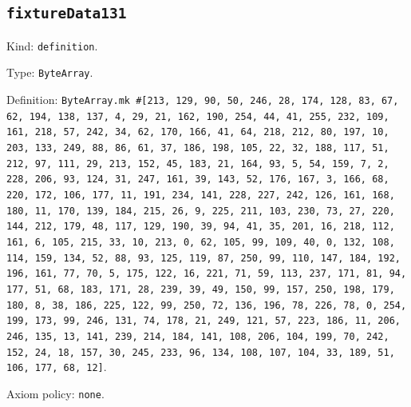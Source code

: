 \documentclass[11pt]{article}
\begin{document}
\subsection*{\texttt{fixtureData131}}
\noindent Kind: \texttt{definition}.\par
\noindent Type: \texttt{ByteArray}.\par
\noindent Definition: \texttt{ByteArray.mk \#[213, 129, 90, 50, 246, 28, 174, 128, 83, 67, 62, 194, 138, 137, 4, 29, 21, 162, 190, 254, 44, 41, 255, 232, 109, 161, 218, 57, 242, 34, 62, 170, 166, 41, 64, 218, 212, 80, 197, 10, 203, 133, 249, 88, 86, 61, 37, 186, 198, 105, 22, 32, 188, 117, 51, 212, 97, 111, 29, 213, 152, 45, 183, 21, 164, 93, 5, 54, 159, 7, 2, 228, 206, 93, 124, 31, 247, 161, 39, 143, 52, 176, 167, 3, 166, 68, 220, 172, 106, 177, 11, 191, 234, 141, 228, 227, 242, 126, 161, 168, 180, 11, 170, 139, 184, 215, 26, 9, 225, 211, 103, 230, 73, 27, 220, 144, 212, 179, 48, 117, 129, 190, 39, 94, 41, 35, 201, 16, 218, 112, 161, 6, 105, 215, 33, 10, 213, 0, 62, 105, 99, 109, 40, 0, 132, 108, 114, 159, 134, 52, 88, 93, 125, 119, 87, 250, 99, 110, 147, 184, 192, 196, 161, 77, 70, 5, 175, 122, 16, 221, 71, 59, 113, 237, 171, 81, 94, 177, 51, 68, 183, 171, 28, 239, 39, 49, 150, 99, 157, 250, 198, 179, 180, 8, 38, 186, 225, 122, 99, 250, 72, 136, 196, 78, 226, 78, 0, 254, 199, 173, 99, 246, 131, 74, 178, 21, 249, 121, 57, 223, 186, 11, 206, 246, 135, 13, 141, 239, 214, 184, 141, 108, 206, 104, 199, 70, 242, 152, 24, 18, 157, 30, 245, 233, 96, 134, 108, 107, 104, 33, 189, 51, 106, 177, 68, 12]}.\par
\noindent Axiom policy: \texttt{none}.\par
\end{document}
